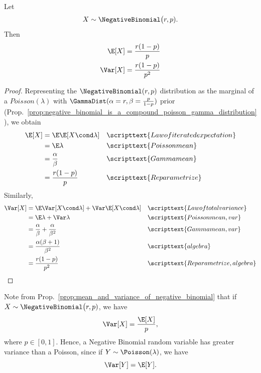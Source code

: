\documentclass{article} %
\begin{document}
\begin{proposition}
Let 
\[X \sim \NegativeBinomial\big(r, p). \]
%
Then
%
\begin{align*}
\E[X] &= \frac{r (1-p)}{p} \\	
\Var[X] &= \frac{r (1-p)}{p^2} \\
\end{align*}
\label{prop:mean_and_variance_of_negative_binomial}
\end{proposition}
 
\begin{proof}
Representing the $\NegativeBinomial (r,p)$ distribution as the marginal of a $Poisson(\lambda)$ with $\GammaDist(\alpha = r, \beta = \frac{p}{1-p})$ prior (Prop.~\ref{prop:negative_binomial_is_a_compound_poisson_gamma_distribution}), we obtain
%
\begin{align*}
\E[X] &= \E 	\E[X \cond \lambda]  && \scripttext{Law of iterated expectation} \\
&= \E \lambda && \scripttext{Poisson mean} \\
&= \frac{\alpha}{\beta} &&\scripttext{Gamma mean} \\
&= \frac{r (1-p)}{p} && \scripttext{Reparametrize}
\end{align*}
%
Similarly, 
%
\begin{align*}
\Var[X] &= \E 	\Var[X \cond \lambda] +  \Var 	\E[X \cond \lambda] && \scripttext{Law of total variance} \\
&= \E \lambda + \Var \lambda && \scripttext{Poisson mean, var} \\
&= \frac{\alpha}{\beta} + \frac{\alpha}{\beta^2} && \scripttext{Gamma mean, var} \\
&= \frac{\alpha (\beta+1)}{\beta^2} && \scripttext{algebra} \\
&= \frac{r (1-p)}{p^2} && \scripttext{Reparametrize, algebra}
\end{align*}
	
\end{proof}


\begin{remark}

Note from Prop.~\ref{prop:mean_and_variance_of_negative_binomial} that if $X \sim \NegativeBinomial\big(r, p)$, we have 
\[\Var[X] = \frac{\E[X]}{p}, \]
where $p \in [0,1]$.  Hence, a Negative Binomial random variable has greater variance than a Poisson, since  if $Y \sim \Poisson(\lambda)$, we have 
\[\Var[Y] = \E[Y].\]
\end{remark}
\end{document}
